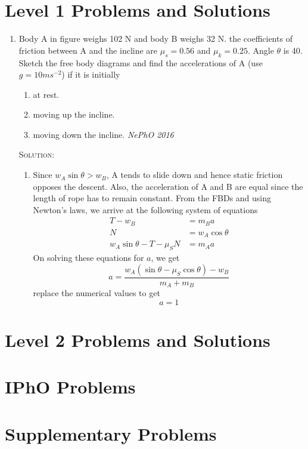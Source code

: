 \section{Level 1 Problems and Solutions}

\begin{enumerate}

\item Body A in figure weighs 102 N and body B weighs 32 N. the coefficients of friction between A and the incline are $\mu_s=0.56$ and $\mu_k=0.25$. Angle $\theta$ is 40\degree. Sketch the free body diagrams and find the accelerations of A (use $g=10\si{ms^{-2}}$) if it is initially 
\begin{enumerate}
\item at rest.
\item moving up the incline.
\item moving down the incline. \hfill \textit{NePhO 2016}
\end{enumerate}
\textsc{Solution:}
\begin{enumerate}
\item Since $w_A \sin \theta > w_B$, A tends to slide down and hence static friction opposes the descent. Also, the acceleration of A and B are equal since the length of rope has to remain constant.
From the FBDs and using Newton's laws, we arrive at the following system of equations
\begin{align*}
T-w_B &= m_B a\\
N&= w_A\cos\theta\\
w_A\sin\theta - T - \mu_S N &= m_A a
\end{align*}
On solving these equations for $a$, we get
\begin{equation*}
a=\frac{w_A(\sin\theta - \mu_S \cos\theta)-w_B}{m_A+m_B}
\end{equation*}
replace the numerical values to get
\[
a=1
\]

\end{enumerate}


\end{enumerate}

\section{Level 2 Problems and Solutions}

\section{IPhO Problems}

\section{Supplementary Problems}